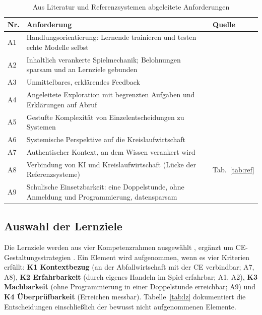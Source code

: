 \documentclass[sigconf,nonacm]{acmart}
\begin{document}
\begin{table}[t]
\caption{Aus Literatur und Referenzsystemen abgeleitete Anforderungen}
\label{tab:req}
\small
\begin{tabularx}{\columnwidth}{@{}L{0.55cm} Y L{1.9cm}@{}}
\toprule
\textbf{Nr.} & \textbf{Anforderung} & \textbf{Quelle}\\
\midrule
A1 & Handlungsorientierung: Lernende trainieren und testen echte Modelle selbst & \cite{long2020,druga2019}\\
A2 & Inhaltlich verankerte Spielmechanik; Belohnungen sparsam und an Lernziele gebunden & \cite{plass2015,hanus2015}\\
A3 & Unmittelbares, erklärendes Feedback & \cite{hattie2007,shute2008}\\
A4 & Angeleitete Exploration mit begrenzten Aufgaben und Erklärungen auf Abruf & \cite{kirschner2006}\\
A5 & Gestufte Komplexität von Einzelentscheidungen zu Systemen & \cite{sweller1988,paas2010}\\
A6 & Systemische Perspektive auf die Kreislaufwirtschaft & \cite{kirchherr2017,wiek2011}\\
A7 & Authentischer Kontext, an dem Wissen verankert wird & \cite{ctgv1990}\\
A8 & Verbindung von KI und Kreislaufwirtschaft (Lücke der Referenzsysteme) & Tab.~\ref{tab:ref}\\
A9 & Schulische Einsetzbarkeit: eine Doppelstunde, ohne Anmeldung und Programmierung, datensparsam & \cite{kmk2016}\\
\bottomrule
\end{tabularx}
\end{table}

\subsection{Auswahl der Lernziele}
Die Lernziele werden aus vier Kompetenzrahmen ausgewählt \cite{long2020,touretzky2019,unesco2024,wiek2011}, ergänzt um CE-Gestaltungsstrategien \cite{bocken2016,stahel2013}. Ein Element wird aufgenommen, wenn es vier Kriterien erfüllt: \textbf{K1 Kontextbezug} (an der Abfallwirtschaft mit der CE verbindbar; A7, A8), \textbf{K2 Erfahrbarkeit} (durch eigenes Handeln im Spiel erfahrbar; A1, A2), \textbf{K3 Machbarkeit} (ohne Programmierung in einer Doppelstunde erreichbar; A9) und \textbf{K4 Überprüfbarkeit} (Erreichen messbar). Tabelle~\ref{tab:lz} dokumentiert die Entscheidungen einschließlich der bewusst nicht aufgenommenen Elemente.
\end{document}
